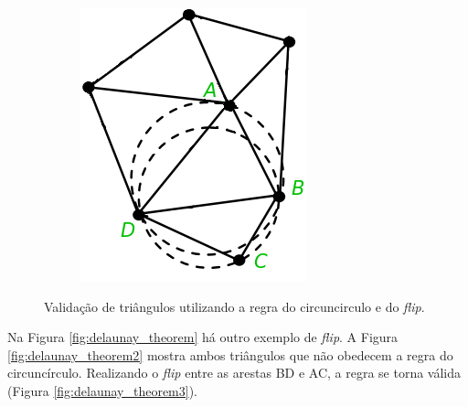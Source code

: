 \begin{figure}[H]
\begin{subfigure}[t]{0.3\textwidth}
        \includegraphics[width=\textwidth]{dados/figuras/delaunay2.png}
        \label{fig:delaunay2}
    \end{subfigure}
    \caption{Validação de triângulos utilizando a regra do circuncirculo e do \textit{flip}.}
    \vspace{-0.8em}
    \label{fig:delaunay}
\end{figure}

Na Figura \ref{fig:delaunay_theorem} há outro exemplo de \textit{flip}. A Figura \ref{fig:delaunay_theorem2} mostra ambos triângulos que não obedecem a regra do circuncírculo. Realizando o \textit{flip} entre as arestas BD e AC, a regra se torna válida (Figura \ref{fig:delaunay_theorem3}). 

